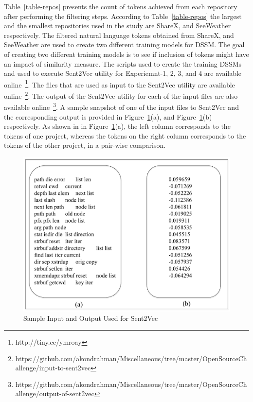 \documentclass[conference]{IEEEtran}
\begin{document}
Table~\ref{table-repos} presents the count of tokens achieved from each repository after performing the filtering steps. According to Table~\ref{table-repos} the largest and the smallest repositories used in the study are ShareX, and SeeWeather respectively. The filtered natural language tokens obtained from ShareX, and SeeWeather are used to create two different training models for DSSM. The goal of creating two different training models is to see if inclusion of tokens might have an impact of similarity measure. The scripts used to create the training DSSMs and used to execute Sent2Vec utility for Experiemnt-1, 2, 3, and 4 are available online~\footnote{http://tiny.cc/ymroay}. The files that are used as input to the Sent2Vec utility are available online~\footnote{https://github.com/akondrahman/Miscellaneous/tree/master/OpenSourceChallenge/input-to-sent2vec}. The output of the Sent2Vec utility for each of the input files are also available online~\footnote{https://github.com/akondrahman/Miscellaneous/tree/master/OpenSourceChallenge/output-of-sent2vec}. A sample snapshot of one of the input files to Sent2Vec and the corresponding output is provided in Figure~\ref{fig-sample-output}(a), and Figure~\ref{fig-sample-output}(b) respectively. As shown in in Figure~\ref{fig-sample-output}(a), the left column corresponds to the tokens of one project, whereas the tokens on the right column corresponds to the tokens of the other project, in a pair-wise comparison.       
  
\begin{figure}[htbp]
\centering
\includegraphics[scale=0.35]{plots/io_sent2vec.pdf}
\caption{Sample Input and Output Used for Sent2Vec}
\label{fig-sample-output}
\end{figure}
\end{document}
